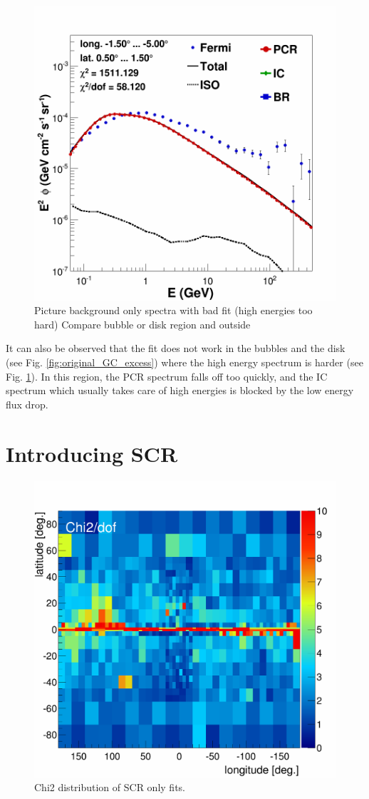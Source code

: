 \begin{figure}[h]
  \centering
  \includegraphics[width=.5\linewidth]{pic/results/BKGonly_CMZ.png}
  \caption{Picture background only spectra with bad fit (high energies too hard) Compare bubble or disk region and outside}
  \label{fig:bkgd_only_spectrum}
\end{figure}

It can also be observed that the fit does not work in the bubbles and the disk (see Fig. \ref{fig:original_GC_excess}) where the high energy spectrum is harder (see Fig. \ref{fig:bkgd_only_spectrum}). In this region, the PCR spectrum falls off too quickly, and the IC spectrum which usually takes care of high energies is blocked by the low energy flux drop.




\section{Introducing SCR}

\begin{figure}[h]
  	\centering
	\includegraphics[width=.5\linewidth]{pic/results/SCRonly_Chi2Distribution.png}
  	\caption{Chi2 distribution of SCR only fits.}
  	\label{fig:SCRonly_fit}
\end{figure}

